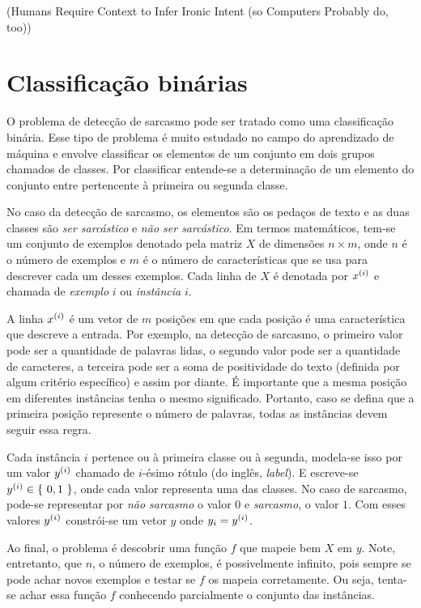 (Humans Require Context to Infer Ironic Intent (so Computers Probably do, too))

\section{Classificação binárias}%
\label{sec:classificacao_binarias}

O problema de detecção de sarcasmo pode ser tratado como uma classificação
binária. Esse tipo de problema é muito estudado no campo do aprendizado de
máquina e envolve classificar os elementos de um conjunto em dois grupos
chamados de classes. Por classificar entende-se a determinação de um elemento do
conjunto entre pertencente à primeira ou segunda classe.

No caso da detecção de sarcasmo, os elementos são os pedaços de texto e as duas
classes são \textit{ser sarcástico} e \textit{não ser sarcástico}. Em termos
matemáticos, tem-se um conjunto de exemplos denotado pela matriz $X$ de
dimensões $n\times m$, onde $n$ é o número de exemplos e $m$ é o número de
características que se usa para descrever cada um desses exemplos. Cada linha de
$X$ é denotada por $\xii[x]{i}$ e chamada de \textit{exemplo} $i$ ou
\textit{instância} $i$.

A linha $\xii[x]{i}$ é um vetor de $m$ posições em que cada posição é uma
característica que descreve a entrada. Por exemplo, na detecção de sarcasmo, o
primeiro valor pode ser a quantidade de palavras lidas, o segundo valor pode ser
a quantidade de caracteres, a terceira pode ser a soma de positividade do texto
(definida por algum critério específico) e assim por diante. É importante que a
mesma posição em diferentes instâncias tenha o mesmo significado. Portanto, caso
se defina que a primeira posição represente o número de palavras, todas as
instâncias devem seguir essa regra.

Cada instância $i$ pertence ou à primeira classe ou à segunda, modela-se isso
por um valor $\xii[y]{i}$ chamado de $i$-ésimo rótulo (do inglês,
\textit{label}). E escreve-se $\xii[y]{i}\in\set{0, 1}$, onde cada valor
representa uma das classes. No caso de sarcasmo, pode-se representar por
\textit{não sarcasmo} o valor $0$ e \textit{sarcasmo}, o valor $1$. Com esses
valores $\xii[y]{i}$ constrói-se um vetor $y$ onde $y_i=\xii[y]{i}$.

Ao final, o problema é descobrir uma função $f$ que mapeie bem $X$ em $y$. Note,
entretanto, que $n$, o número de exemplos, é possivelmente infinito, pois sempre
se pode achar novos exemplos e testar se $f$ os mapeia corretamente. Ou seja,
tenta-se achar essa função $f$ conhecendo parcialmente o conjunto das
instâncias.

